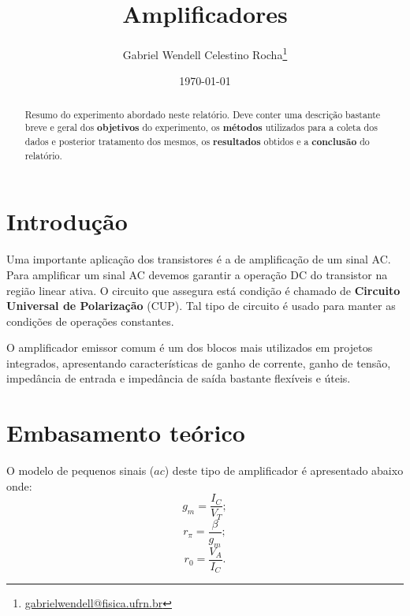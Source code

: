 \documentclass[letterpaper, 12pt]{article}
\begin{document}
\title{\bf Amplificadores}
\author{Gabriel Wendell Celestino Rocha\footnote{\href{mailto:gabrielwendell@fisica.ufrn.br}{gabrielwendell@fisica.ufrn.br}}}
\date{\today}
\maketitle

\begin{abstract}
Resumo do experimento abordado neste relatório. Deve conter uma descrição bastante breve e geral dos \textbf{objetivos} do experimento, os \textbf{métodos} utilizados para a coleta dos dados e posterior tratamento dos mesmos, os \textbf{resultados} obtidos e a \textbf{conclusão} do relatório.
\end{abstract}



\section{Introdução}\label{Sec 1 - Introdução}
Uma importante aplicação dos transistores é a de amplificação de um sinal AC. Para amplificar um sinal AC devemos garantir a operação DC do transistor na região linear ativa. O circuito que assegura está condição é chamado de \textbf{Circuito Universal de Polarização} (CUP). Tal tipo de circuito é usado para manter as condições de operações constantes.

O amplificador emissor comum é um dos blocos mais utilizados em projetos integrados, apresentando características de ganho de corrente, ganho de tensão, impedância de entrada e impedância de saída bastante flexíveis e úteis.



\section{Embasamento teórico}\label{Sec 2 - Teoria}
O modelo de pequenos sinais ($ac$) deste tipo de amplificador é apresentado abaixo onde:
\begin{equation}
    g_{m}=\frac{I_{C}}{V_{T}};
\end{equation}
\begin{equation}
    r_{\pi}=\frac{\beta}{g_{m}};
\end{equation}
\begin{equation}
    r_{0}=\frac{V_{A}}{I_{C}}.
\end{equation}
\end{document}
